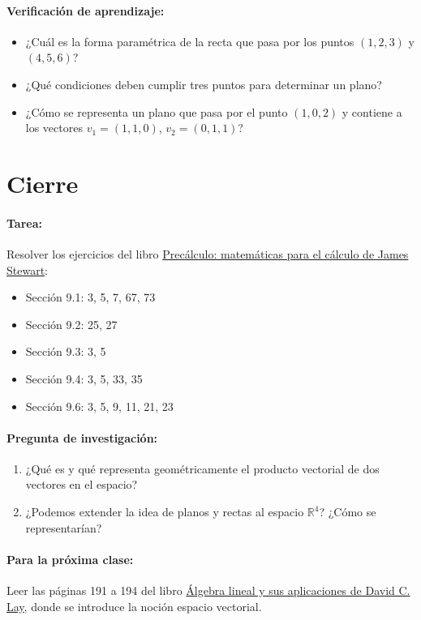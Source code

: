 \documentclass[a4,11pt]{aleph-notas}
\begin{document}
\paragraph{Verificación de aprendizaje:}  
\begin{itemize}[leftmargin=*]
    \item ¿Cuál es la forma paramétrica de la recta que pasa por los puntos \((1,2,3)\) y \((4,5,6)\)?
    \item ¿Qué condiciones deben cumplir tres puntos para determinar un plano?
    \item ¿Cómo se representa un plano que pasa por el punto \((1,0,2)\) y contiene a los vectores \({v}_1 = (1,1,0)\), \({v}_2 = (0,1,1)\)?
\end{itemize}

\section*{Cierre}  

\paragraph{Tarea:}  
Resolver los ejercicios del libro \href{https://puce.odilo.us/info/precalculo-matematicas-para-el-calculo-03111193}{Precálculo: matemáticas para el cálculo de James Stewart}:  

\begin{itemize}[leftmargin=*]
    \item Sección 9.1: 3, 5, 7, 67, 73
    \item Sección 9.2: 25, 27
    \item Sección 9.3: 3, 5
    \item Sección 9.4: 3, 5, 33, 35
    \item Sección 9.6: 3, 5, 9, 11, 21, 23
\end{itemize}

\paragraph{Pregunta de investigación:}  
\begin{enumerate}[leftmargin=*]
    \item ¿Qué es y qué representa geométricamente el producto vectorial de dos vectores en el espacio?
    \item ¿Podemos extender la idea de planos y rectas al espacio \(\mathbb{R}^4\)? ¿Cómo se representarían?
\end{enumerate}

\paragraph{Para la próxima clase:}  
Leer las páginas 191 a 194 del libro \href{https://catalogobiblioteca.puce.edu.ec/cgi-bin/koha/opac-detail.pl?biblionumber=86083}{Álgebra lineal y sus aplicaciones de David C. Lay}, donde se introduce la noción espacio vectorial.
\end{document}
